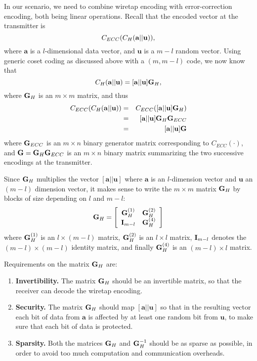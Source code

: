 \documentclass{article}[11pt]
\newcommand{\av}{\mathbf{a}}
\newcommand{\uv}{\mathbf{u}}
\begin{document}
In our scenario, we need to combine wiretap encoding with error-correction
encoding, both being linear operations. Recall that
the encoded vector at the transmitter is
\[
C_{ECC}(C_H({\bf a}||{\bf u})),
\]
where $\av$ is a $l$-dimensional data vector, and $\uv$ is a $m-l$ random
vector. Using generic coset coding as discussed above with a $(m,m-l)$ code,
we now know that
\[
C_H({\bf a}||{\bf u})=[\av||\uv]{\bf G}_H,
\]
where ${\bf G}_H$ is an $m\times m$ matrix, and thus
\begin{eqnarray}
C_{ECC}(C_H({\bf a}||{\bf u}))
&=& C_{ECC}([{\bf a}||{\bf u}] {\bf G}_H) \nonumber \\
&=&[{\bf a}||{\bf u}] {\bf G}_H{\bf G}_{ECC} \nonumber \\
&=& [{\bf a}||{\bf u}] {\bf G} \label{eq:zfinal}
\end{eqnarray}
where  ${\bf G}_{ECC}$ is an $m \times n$ binary generator matrix
corresponding to $C_{ECC}(\cdot)$, and ${\bf G} ={\bf G}_H{\bf G}_{ECC}$
is an $m \times n$ binary matrix summarizing the two successive encodings
at the transmitter.

Since ${\bf G}_H$ multiplies the vector $[\av||\uv]$ where $\av$ is an
$l$-dimension vector and $\uv$ an $(m-l)$ dimension vector, it makes
sense to write the $m\times m$ matrix ${\bf G}_H$ by blocks of size
depending on $l$ and $m-l$:
\begin{equation}\label{RECURRMATR}
{\bf G}_H =
\left[
\begin{array}{cc}
{\bf G}_H^{(1)} & {\bf G}_H^{(2)} \\
{\bf I}_{m-l} & {\bf G}_H^{(4)}
\end{array}
\right]
\end{equation}
where ${\bf G}_H^{(1)}$ is an $l\times (m-l)$ matrix,
${\bf G}_H^{(2)}$ is an $l\times l$ matrix, ${\bf I}_{m-l}$ denotes the
$(m-l)\times (m-l)$ identity matrix, and finally
${\bf G}_H^{(4)}$ is an $(m-l)\times l$ matrix.

Requirements on the matrix ${\bf G}_H$ are:
\begin{enumerate}
\item
{\bf Invertibility.}
The matrix ${\bf G}_H$ should be an invertible matrix, so that the
receiver can decode the wiretap encoding.
\item
{\bf Security.}
The matrix ${\bf G}_H$ should map $[\av||\uv]$ so that in the resulting
vector each bit of data from $\av$ is affected by at least one random
bit from $\uv$, to make sure that each bit of data is protected.
\item
{\bf Sparsity.}
Both the matrices ${\bf G}_H$ and ${\bf G}^{-1}_H$ should be
as sparse as possible, in order to avoid too much computation and
communication overheads.
\end{enumerate}
\end{document}
